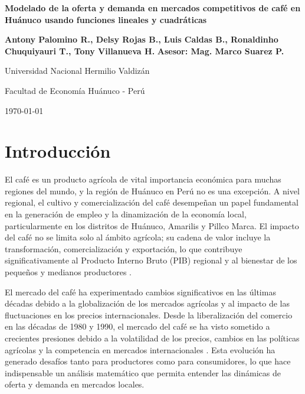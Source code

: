 \documentclass[12pt, a4paper]{article}
\begin{document}
\onehalfspacing
\begin{titlepage}
    \begin{center}
        \vspace*{1in}
        \Huge\textbf{Modelado de la oferta y demanda en mercados competitivos de café en Huánuco usando funciones lineales y cuadráticas}
        \vspace{0.5in}
        
        \Large\textbf{Antony Palomino R., Delsy Rojas B., Luis Caldas B., Ronaldinho Chuquiyauri T., Tony Villanueva H.}
        \textbf{Asesor: Mag. Marco Suarez P.}
        \vspace{0.5in}
        
        \Large Universidad Nacional Hermilio Valdizán
        
        \Large Facultad de Economía
        \vfill
        \large Huánuco - Perú
        
        \large\today
    \end{center}
\end{titlepage}

\tableofcontents
\newpage
\section{Introducción}

El café es un producto agrícola de vital importancia económica para muchas regiones del mundo, y la región de Huánuco en Perú no es una excepción. A nivel regional, el cultivo y comercialización del café desempeñan un papel fundamental en la generación de empleo y la dinamización de la economía local, particularmente en los distritos de Huánuco, Amarilis y Pillco Marca. El impacto del café no se limita solo al ámbito agrícola; su cadena de valor incluye la transformación, comercialización y exportación, lo que contribuye significativamente al Producto Interno Bruto (PIB) regional y al bienestar de los pequeños y medianos productores \parencite{jha2014, gonzalez2019}.

El mercado del café ha experimentado cambios significativos en las últimas décadas debido a la globalización de los mercados agrícolas y al impacto de las fluctuaciones en los precios internacionales. Desde la liberalización del comercio en las décadas de 1980 y 1990, el mercado del café se ha visto sometido a crecientes presiones debido a la volatilidad de los precios, cambios en las políticas agrícolas y la competencia en mercados internacionales \parencite{daviron2005}. Esta evolución ha generado desafíos tanto para productores como para consumidores, lo que hace indispensable un análisis matemático que permita entender las dinámicas de oferta y demanda en mercados locales.
\end{document}
